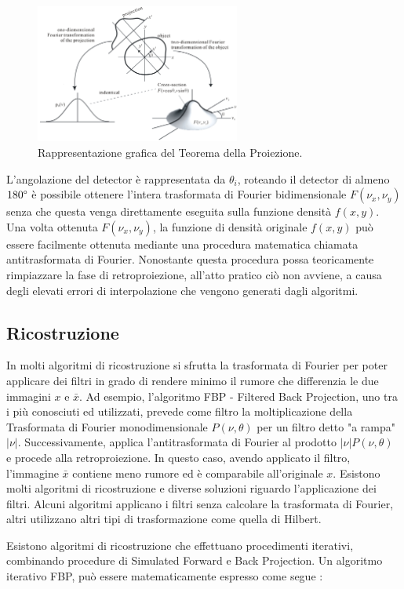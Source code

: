 \documentclass[a4paper,12pt, doubleside]{report}
\begin{document}
                    \begin{figure}[h]
                        \centering
                        \includegraphics[width=0.6\textwidth]{fourier}
                        \caption{Rappresentazione grafica del Teorema della Proiezione.}
                        \label{fig:itk}        
                    \end{figure}    
            
                \par
                    L'angolazione del detector è rappresentata da $\theta_i$, roteando il detector di almeno $180\degree$ è possibile ottenere l'intera trasformata di Fourier bidimensionale $F(\nu_x,\nu_y)$ senza che questa venga direttamente eseguita sulla funzione densità $f(x,y)$.
                    Una volta ottenuta $F(\nu_x,\nu_y)$, la funzione di densità originale $f(x,y)$ può essere facilmente ottenuta mediante una procedura matematica chiamata antitrasformata di Fourier. Nonostante questa procedura possa teoricamente rimpiazzare la fase di retroproiezione, all'atto pratico ciò non avviene, a causa degli elevati errori di interpolazione che vengono generati dagli algoritmi.
            
            \subsection{Ricostruzione}
                \par
                    In molti algoritmi di ricostruzione si sfrutta la trasformata di Fourier per poter applicare dei filtri in grado di rendere minimo il rumore che differenzia le due immagini $x$ e $\bar{x}$. Ad esempio, l'algoritmo FBP - Filtered Back Projection, uno tra i più conosciuti ed utilizzati, prevede come filtro la moltiplicazione della Trasformata di Fourier monodimensionale $P(\nu,\theta)$ per un filtro detto "a rampa" $|\nu|$. Successivamente, applica l'antitrasformata di Fourier al prodotto $|\nu|P(\nu, \theta)$ e procede alla retroproiezione. In questo caso, avendo applicato il filtro, l'immagine $\bar{x}$ contiene meno rumore ed è comparabile all'originale $x$. Esistono molti algoritmi di ricostruzione e diverse soluzioni riguardo l'applicazione dei filtri. Alcuni algoritmi applicano i filtri senza calcolare la trasformata di Fourier, altri utilizzano altri tipi di trasformazione come quella di Hilbert. 
                \bigskip
                \par
                    Esistono algoritmi di ricostruzione che effettuano procedimenti iterativi, combinando procedure di Simulated Forward e Back Projection. Un algoritmo iterativo FBP, può essere matematicamente espresso come segue \cite{fessler}:
                   
\end{document}
